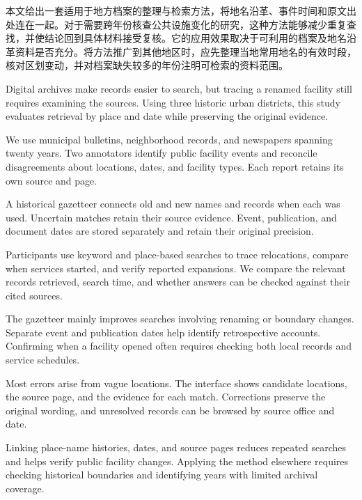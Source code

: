 \begin{cabstract}
本文给出一套适用于地方档案的整理与检索方法，将地名沿革、事件时间和原文出处连在一起。对于需要跨年份核查公共设施变化的研究，这种方法能够减少重复查找，并使结论回到具体材料接受复核。它的应用效果取决于可利用的档案及地名沿革资料是否充分。将方法推广到其他地区时，应先整理当地常用地名的有效时段，核对区划变动，并对档案缺失较多的年份注明可检索的资料范围。

\end{cabstract}


\begin{eabstract}

Digital archives make records easier to search, but tracing a renamed facility still
requires examining the sources. Using three historic urban districts, this study
evaluates retrieval by place and date while preserving the original evidence.

We use municipal bulletins, neighborhood records, and newspapers spanning twenty
years. Two annotators identify public facility events and reconcile disagreements about
locations, dates, and facility types. Each report retains its own source and page.

A historical gazetteer connects old and new names and records when each was used.
Uncertain matches retain their source evidence. Event, publication, and document dates
are stored separately and retain their original precision.

Participants use keyword and place-based searches to trace relocations, compare when services
started, and verify reported expansions. We compare the relevant records retrieved,
search time, and whether answers can be checked against their cited sources.

The gazetteer mainly improves searches involving renaming or boundary changes.
Separate event and publication dates help identify retrospective accounts. Confirming
when a facility opened often requires checking both local records and service schedules.

Most errors arise from vague locations. The interface shows candidate locations, the
source page, and the evidence for each match. Corrections preserve the original
wording, and unresolved records can be browsed by source office and date.

Linking place-name histories, dates, and source pages reduces repeated searches and
helps verify public facility changes. Applying the method elsewhere requires checking
historical boundaries and identifying years with limited archival coverage.

\end{eabstract}

